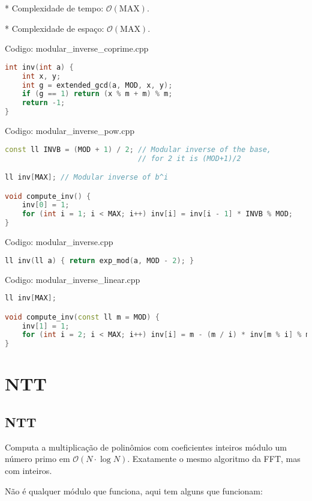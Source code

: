 \documentclass[10pt, a4paper, oneside]{book}
\begin{document}
* Complexidade de tempo: $\mathcal{O}(\text{MAX})$.

* Complexidade de espaço: $\mathcal{O}(\text{MAX})$.
\hfill

Codigo: modular\_inverse\_coprime.cpp

\begin{lstlisting}[language=C++]
int inv(int a) {
    int x, y;
    int g = extended_gcd(a, MOD, x, y);
    if (g == 1) return (x % m + m) % m;
    return -1;
}
\end{lstlisting}
\hfill

Codigo: modular\_inverse\_pow.cpp

\begin{lstlisting}[language=C++]
const ll INVB = (MOD + 1) / 2; // Modular inverse of the base,
                               // for 2 it is (MOD+1)/2

ll inv[MAX]; // Modular inverse of b^i

void compute_inv() {
    inv[0] = 1;
    for (int i = 1; i < MAX; i++) inv[i] = inv[i - 1] * INVB % MOD;
}
\end{lstlisting}
\hfill

Codigo: modular\_inverse.cpp

\begin{lstlisting}[language=C++]
ll inv(ll a) { return exp_mod(a, MOD - 2); }
\end{lstlisting}
\hfill

Codigo: modular\_inverse\_linear.cpp

\begin{lstlisting}[language=C++]
ll inv[MAX];

void compute_inv(const ll m = MOD) {
    inv[1] = 1;
    for (int i = 2; i < MAX; i++) inv[i] = m - (m / i) * inv[m % i] % m;
}
\end{lstlisting}
\hfill

\section{NTT}
\subsection{NTT}


Computa a multiplicação de polinômios com coeficientes inteiros módulo um número primo em $\mathcal{O}(N \cdot \log N)$. Exatamente o mesmo algoritmo da FFT, mas com inteiros.



Não é qualquer módulo que funciona, aqui tem alguns que funcionam:
\end{document}
